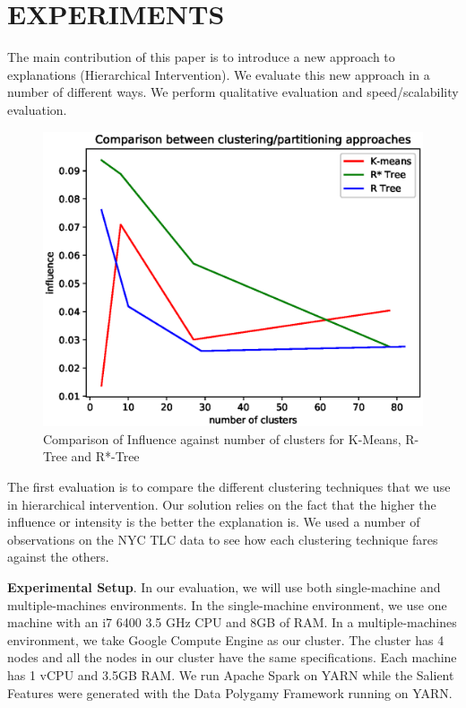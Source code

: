 \section{EXPERIMENTS}
\label{sec:evaluation}
The main contribution of this paper is to introduce a new approach to explanations (Hierarchical Intervention). We evaluate this new approach in a number of different ways. We perform qualitative evaluation and speed/scalability evaluation.

\begin{figure}[h]
	\includegraphics[width=0.96\columnwidth]{images/clustering_comparison}
	\caption{Comparison of Influence against number of clusters for K-Means, R-Tree and R*-Tree}
	\label{fig:clustering_comparison}
\end{figure}

The first evaluation is to compare the different clustering techniques that we use in hierarchical intervention. Our solution relies on the fact that the higher the influence or intensity is the better the explanation is. We used a number of observations on the NYC TLC data to see how each clustering technique fares against the others.

\textbf{Experimental Setup}. 
In our evaluation, we will use both single-machine and multiple-machines environments. 
In the single-machine environment, we use one machine with an i7 6400 3.5 GHz CPU and 8GB of RAM. 
In a multiple-machines environment, we take Google Compute Engine as our cluster. 
The cluster has 4 nodes and all the nodes in our cluster have the same specifications.
Each machine has 1 vCPU and 3.5GB RAM.
We run Apache Spark on YARN while the Salient Features were generated with the Data Polygamy Framework running on YARN. 

